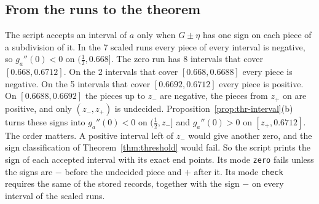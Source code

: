 \subsection{From the runs to the theorem}\label{or:thr-runs}

The script accepts an interval of $a$ only when $G\pm\eta$ has one sign on
each piece of a subdivision of it. In the 7 scaled runs every piece of every
interval is negative, so $g_a''(0)<0$ on $(\frac12,0.668]$. The zero run has 8
intervals that cover $[0.668,0.6712]$. On the 2 intervals that cover
$[0.668,0.6688]$ every piece is negative. On the 5 intervals that cover
$[0.6692,0.6712]$ every piece is positive. On $[0.6688,0.6692]$ the pieces
up to $z_-$ are negative, the pieces from $z_+$ on are positive, and only
$(z_-,z_+)$ is undecided. Proposition~\ref{prop:thr-interval}(b) turns these
signs into $g_a''(0)<0$ on $(\frac12,z_-]$ and $g_a''(0)>0$ on
$[z_+,0.6712]$. The order matters. A positive interval left of $z_-$ would
give another zero, and the sign classification of Theorem~\ref{thm:threshold} would
fail. So the script prints the sign of each accepted interval with its exact
end points. Its mode \texttt{zero} fails unless the signs are $-$ before the
undecided piece and $+$ after it. Its mode \texttt{check} requires the same of
the stored records, together with the sign $-$ on every interval of the scaled
runs.


